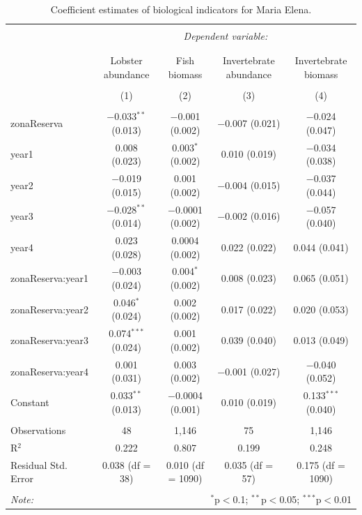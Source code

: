 \documentclass[utf8]{frontiers_suppmat} %
\begin{document}
\begin{table}[!htbp] \centering 
  \caption{Coefficient estimates of biological indicators for Maria Elena.} 
  \label{} 
\tiny 
\begin{tabular}{@{\extracolsep{1pt}}lcccc} 
\\[-1.8ex]\hline 
\hline \\[-1.8ex] 
 & \multicolumn{4}{c}{\textit{Dependent variable:}} \\ 
\cline{2-5} 
\\[-1.8ex] & \multicolumn{4}{c}{} \\ 
 & Lobster abundance & Fish biomass & Invertebrate abundance & Invertebrate biomass \\ 
\\[-1.8ex] & (1) & (2) & (3) & (4)\\ 
\hline \\[-1.8ex] 
 zonaReserva & $-$0.033$^{**}$ (0.013) & $-$0.001 (0.002) & $-$0.007 (0.021) & $-$0.024 (0.047) \\ 
  year1 & 0.008 (0.023) & 0.003$^{*}$ (0.002) & 0.010 (0.019) & $-$0.034 (0.038) \\ 
  year2 & $-$0.019 (0.015) & 0.001 (0.002) & $-$0.004 (0.015) & $-$0.037 (0.044) \\ 
  year3 & $-$0.028$^{**}$ (0.014) & $-$0.0001 (0.002) & $-$0.002 (0.016) & $-$0.057 (0.040) \\ 
  year4 & 0.023 (0.028) & 0.0004 (0.002) & 0.022 (0.022) & 0.044 (0.041) \\ 
  zonaReserva:year1 & $-$0.003 (0.024) & 0.004$^{*}$ (0.002) & 0.008 (0.023) & 0.065 (0.051) \\ 
  zonaReserva:year2 & 0.046$^{*}$ (0.024) & 0.002 (0.002) & 0.017 (0.022) & 0.020 (0.053) \\ 
  zonaReserva:year3 & 0.074$^{***}$ (0.024) & 0.001 (0.002) & 0.039 (0.040) & 0.013 (0.049) \\ 
  zonaReserva:year4 & 0.001 (0.031) & 0.003 (0.002) & $-$0.001 (0.027) & $-$0.040 (0.052) \\ 
  Constant & 0.033$^{**}$ (0.013) & $-$0.0004 (0.001) & 0.010 (0.019) & 0.133$^{***}$ (0.040) \\ 
 \hline \\[-1.8ex] 
Observations & 48 & 1,146 & 75 & 1,146 \\ 
R$^{2}$ & 0.222 & 0.807 & 0.199 & 0.248 \\ 
Residual Std. Error & 0.038 (df = 38) & 0.010 (df = 1090) & 0.035 (df = 57) & 0.175 (df = 1090) \\ 
\hline 
\hline \\[-1.8ex] 
\textit{Note:}  & \multicolumn{4}{r}{$^{*}$p$<$0.1; $^{**}$p$<$0.05; $^{***}$p$<$0.01} \\ 
\end{tabular} 
\end{table}
\end{document}
